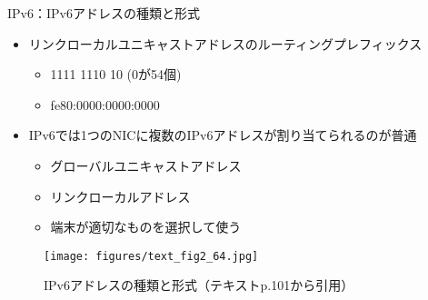 \documentclass[12pt,aspectratio=169]{beamer}
\begin{document}
\begin{frame}{IPv6：IPv6アドレスの種類と形式}

  \begin{minipage}{0.48\textwidth}
    \small
    \begin{itemize}
      \item リンクローカルユニキャストアドレスのルーティングプレフィックス
      \begin{itemize}
        \item 1111 1110 10 (0が54個)
        \item fe80:0000:0000:0000
      \end{itemize}
      \item IPv6では1つのNICに複数のIPv6アドレスが割り当てられるのが普通
      \begin{itemize}
        \item グローバルユニキャストアドレス
        \item リンクローカルアドレス
        \item 端末が適切なものを選択して使う
      \end{itemize}
    \end{itemize}

  \end{minipage}
  \hfill
  \begin{minipage}{0.48\textwidth}
    \vspace{-1\baselineskip}
    \centering
    \begin{figure}
      \centering
      \texttt{[image: figures/text\_fig2\_64.jpg]}
      \label{fig:text_fig2_64}
      \caption{IPv6アドレスの種類と形式（テキストp.101から引用）}
    \end{figure}
  \end{minipage}

\end{frame}
\end{document}

